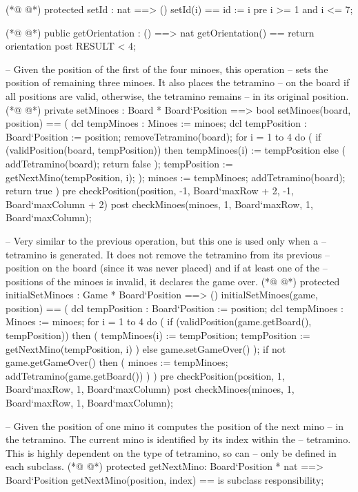 \begin{vdmpp}[breaklines=true]
(*@
\label{setId:61}
@*)
  protected setId : nat ==> ()
  setId(i) == id := i
  pre i >= 1 and i <= 7;
  
(*@
\label{getOrientation:65}
@*)
  public getOrientation : () ==> nat
  getOrientation() == return orientation
  post RESULT < 4;

  -- Given the position of the first of the four minoes, this operation
  -- sets the position of remaining three minoes. It also places the tetramino
  -- on the board if all positions are valid, otherwise, the tetramino remains
  -- in its original position.
(*@
\label{setMinoes:73}
@*)
  private setMinoes : Board * Board`Position ==> bool
  setMinoes(board, position) == (
   dcl tempMinoes : Minoes := minoes;
   dcl tempPosition : Board`Position := position;
   removeTetramino(board);
   for i = 1 to 4 do (
    if (validPosition(board, tempPosition)) 
    then tempMinoes(i) := tempPosition
    else (
     addTetramino(board);
     return false
    );
    tempPosition := getNextMino(tempPosition, i);
   );    
   minoes := tempMinoes;
   addTetramino(board);
   return true
  )
  pre checkPosition(position, -1, Board`maxRow + 2, -1, Board`maxColumn + 2)
  post checkMinoes(minoes, 1, Board`maxRow, 1, Board`maxColumn);
  
  -- Very similar to the previous operation, but this one is used only when a 
  -- tetramino is generated. It does not remove the tetramino from its previous
  -- position on the board (since it was never placed) and if at least one of the
  -- positions of the minoes is invalid, it declares the game over.
(*@
\label{initialSetMinoes:98}
@*)
  protected initialSetMinoes : Game * Board`Position ==> ()
  initialSetMinoes(game, position) == (
   dcl tempPosition : Board`Position := position;
   dcl tempMinoes : Minoes := minoes;
   for i = 1 to 4 do (
    if (validPosition(game.getBoard(), tempPosition)) 
    then (
     tempMinoes(i) := tempPosition;
     tempPosition := getNextMino(tempPosition, i)
    ) 
    else game.setGameOver()
   );   
   if not game.getGameOver() then (
    minoes := tempMinoes;
    addTetramino(game.getBoard())
   )
  )
  pre checkPosition(position, 1, Board`maxRow, 1, Board`maxColumn)
  post checkMinoes(minoes, 1, Board`maxRow, 1, Board`maxColumn);
  
  -- Given the position of one mino it computes the position of the next mino
  -- in the tetramino. The current mino is identified by its index within the
  -- tetramino. This is highly dependent on the type of tetramino, so can 
  -- only be defined in each subclass.
(*@
\label{getNextMino:122}
@*)
  protected getNextMino: Board`Position * nat ==> Board`Position
  getNextMino(position, index) ==
   is subclass responsibility;
   

\end{vdmpp}
